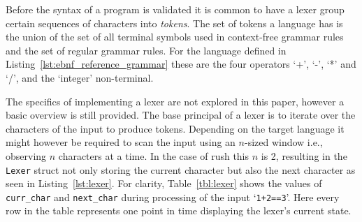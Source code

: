 Before the syntax of a program is validated it is common to have a lexer group certain sequences of characters into \emph{tokens}.
The set of tokens a language has is the union of the set of all terminal symbols used in context-free grammar rules and the set of regular grammar rules.
For the language defined in Listing~\ref{lst:ebnf_reference_grammar} these are the four operators `+', `-', `*' and `/', and the `integer' non-terminal.

The specifics of implementing a lexer are not explored in this paper, however a basic overview is still provided.
The base principal of a lexer is to iterate over the characters of the input to produce tokens.
Depending on the target language it might however be required to scan the input using an $n$-sized window i.e., observing $n$ characters at a time.
In the case of rush this $n$ is 2, resulting in the \Verb|Lexer| struct not only storing the current character but also the next character as seen in Listing~\ref{lst:lexer}.
For clarity, Table~\ref{tbl:lexer} shows the values of \Verb|curr_char| and \Verb|next_char| during processing of the input `\Verb|1+2==3|'.
Here every row in the table represents one point in time displaying the lexer's current state.


